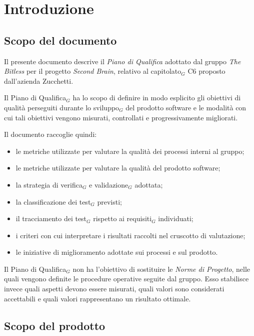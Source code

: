 \documentclass[a4paper, 10pt, colorlinks=true, linkcolor=black, urlcolor=blue, citecolor=blue, hidelinks]{article}
\begin{document}
\newpage

\tableofcontents
\newpage

\listoftables
\newpage

\listoffigures
\newpage

\section{Introduzione}

\subsection{Scopo del documento}

Il presente documento descrive il \textit{Piano di Qualifica} adottato dal gruppo \textit{The Bitless} per il progetto \textit{Second Brain}, relativo al capitolato$_G$ C6 proposto dall'azienda Zucchetti.

Il Piano di Qualifica$_G$ ha lo scopo di definire in modo esplicito gli obiettivi di qualità perseguiti durante lo sviluppo$_G$ del prodotto software e le modalità con cui tali obiettivi vengono misurati, controllati e progressivamente migliorati.

Il documento raccoglie quindi:
\begin{itemize}
    \item le metriche utilizzate per valutare la qualità dei processi interni al gruppo;
    \item le metriche utilizzate per valutare la qualità del prodotto software;
    \item la strategia di verifica$_G$ e validazione$_G$ adottata;
    \item la classificazione dei test$_G$ previsti;
    \item il tracciamento dei test$_G$ rispetto ai requisiti$_G$ individuati;
    \item i criteri con cui interpretare i risultati raccolti nel cruscotto di valutazione;
    \item le iniziative di miglioramento adottate sui processi e sul prodotto.
\end{itemize}

Il Piano di Qualifica$_G$ non ha l'obiettivo di sostituire le \textit{Norme di Progetto}, nelle quali vengono definite le procedure operative seguite dal gruppo. Esso stabilisce invece quali aspetti devono essere misurati, quali valori sono considerati accettabili e quali valori rappresentano un risultato ottimale.

\subsection{Scopo del prodotto}
\end{document}

